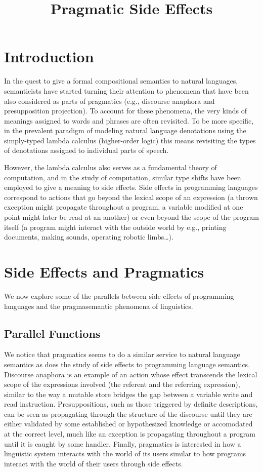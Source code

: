 \documentclass[a4paper,11pt,DIV=12]{scrartcl}
\title{Pragmatic Side Effects}
\date{}
\begin{document}
\maketitle

\section{Introduction}

In the quest to give a formal compositional semantics to natural languages,
semanticists have started turning their attention to phenomena that have
been also considered as parts of pragmatics (e.g., discourse anaphora and
presupposition projection). To account for these phenomena, the very kinds
of meanings assigned to words and phrases are often revisited. To be more
specific, in the prevalent paradigm of modeling natural language
denotations using the simply-typed lambda calculus (higher-order logic)
this means revisiting the types of denotations assigned to individual parts
of speech.

However, the lambda calculus also serves as a fundamental theory of
computation, and in the study of computation, similar type shifts have been
employed to give a meaning to side effects. Side effects in programming
languages correspond to actions that go beyond the lexical scope of an
expression (a thrown exception might propagate throughout a program, a
variable modified at one point might later be read at an another) or even
beyond the scope of the program itself (a program might interact with the
outside world by e.g., printing documents, making sounds, operating robotic
limbs\ldots).

\section{Side Effects and Pragmatics}

We now explore some of the parallels between side effects of programming
languages and the pragmasemantic phenomena of linguistics.

\subsection{Parallel Functions}

We notice that pragmatics seems to do a similar service to natural language
semantics as does the study of side effects to programming language
semantics. Discourse anaphora is an example of an action whose effect
transcends the lexical scope of the expressions involved (the referent and
the referring expression), similar to the way a mutable store bridges the
gap between a variable write and read instruction. Presuppositions, such as
those triggered by definite descriptions, can be seen as propagating
through the structure of the discourse until they are either validated by
some established or hypothesized knowledge or accomodated at the correct
level, much like an exception is propagating throughout a program until it
is caught by some handler. Finally, pragmatics is interested in how a
linguistic system interacts with the world of its users similar to how
programs interact with the world of their users through side effects.
\end{document}
